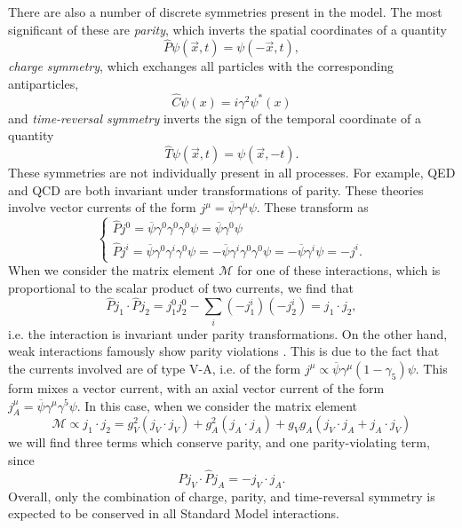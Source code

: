 \documentclass[10pt,a4paper]{book}
\begin{document}
There are also a number of discrete symmetries present in the model. The most significant of these are \emph{parity}, which inverts the spatial coordinates of a quantity
\begin{equation}
\hat{P}\psi(\vec{x}, t) = \psi(-\vec{x}, t),
\end{equation}
\emph{charge symmetry}, which exchanges all particles with the corresponding antiparticles,
\begin{equation}
\hat{C}\psi(x) = i\gamma^2\psi^*(x)
\end{equation}
and \emph{time-reversal symmetry} inverts the sign of the temporal coordinate of a quantity
\begin{equation}
\hat{T}\psi(\vec{x}, t) = \psi(\vec{x}, -t).
\end{equation}
These symmetries are not individually present in all processes. For example, QED and QCD are both invariant under transformations of parity. These theories involve vector currents of the form $j^\mu = \overline{\psi}\gamma^\mu \psi$. These transform as
\begin{equation}
\begin{cases}
\hat{P}j^{0} = \overline{\psi}\gamma^{0}\gamma^{0}\gamma^{0}\psi = \overline{\psi}\gamma^{0}\psi\\
\hat{P}j^{i} = \overline{\psi}\gamma^{0}\gamma^{i}\gamma^{0}\psi = -\overline{\psi}\gamma^{i}\gamma^{0}\gamma^{0}\psi = -\overline{\psi}\gamma^{i}\psi = -j^{i}.
\end{cases}
\end{equation}
When we consider the matrix element $\mathcal{M}$ for one of these interactions, which is proportional to the scalar product of two currents, we find that
\begin{equation}
\hat{P}j_{1} \cdot \hat{P}j_{2} = j^{0}_{1}j^{0}_{2} - \sum_{i}\left(-j^{i}_{1}\right)\left(-j^{i}_{2}\right) = j_{1} \cdot j_{2},
\end{equation}
i.e. the interaction is invariant under parity transformations.
On the other hand, weak interactions famously show parity violations \cite{PhysRev.105.1413}. This is due to the fact that the currents involved are of type V-A, i.e. of the form $j^\mu \propto \overline{\psi}\gamma^\mu\left(1 - \gamma_5\right)\psi$. This form mixes a vector current, with an axial vector current of the form $j^\mu_A = \overline{\psi}\gamma^\mu\gamma^5\psi$. In this case, when we consider the matrix element
\begin{equation}
\mathcal{M} \propto j_{1} \cdot j_{2} = g^{2}_{V}(j_{V} \cdot j_{V}) + g^{2}_{A}(j_{A} \cdot j_{A}) + g_{V}g_{A}(j_{V} \cdot j_{A} + j_{A} \cdot j_{V})
\end{equation}
we will find three terms which conserve parity, and one parity-violating term, since
\begin{equation}
\hat{P}j_{V} \cdot \hat{P}j_{A} = -j_{V} \cdot j_{A}.
\end{equation}
Overall, only the combination of charge, parity, and time-reversal symmetry is expected to be conserved in all Standard Model interactions.
\end{document}
